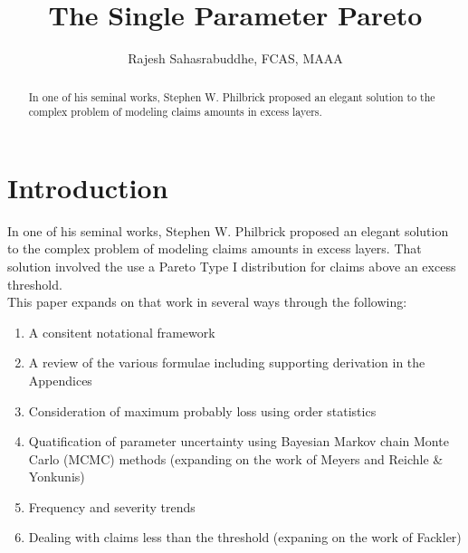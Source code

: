 \documentclass[]{article} %
\title{The Single Parameter Pareto}
\author{Rajesh Sahasrabuddhe, FCAS, MAAA}
\begin{document}
\maketitle

\begin{abstract}
In one of his seminal works, Stephen W. Philbrick proposed an elegant solution to the complex problem of modeling claims amounts in excess layers. 

\end{abstract}

\section{Introduction}
In one of his seminal works, Stephen W. Philbrick\cite{Philbrick} proposed an elegant solution to the complex problem of modeling claims amounts in excess layers. That solution involved the use a Pareto Type I distribution for claims above an excess threshold.\\

This paper expands on that work in several ways through the following:
\begin{enumerate}
\item A consitent notational framework
\item A review of the various formulae including supporting derivation in the Appendices
\item Consideration of maximum probably loss using order statistics
\item Quatification of parameter uncertainty using Bayesian Markov chain Monte Carlo (MCMC) methods (expanding on the work of Meyers and Reichle \& Yonkunis)
\item Frequency and severity trends
\item Dealing with claims less than the threshold (expaning on the work of Fackler)
\end{enumerate}



\end{document}
